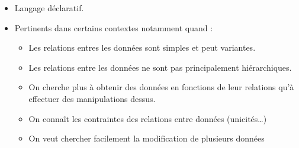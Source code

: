 \begin{slide}
	\begin{itemize}
				\item Langage déclaratif.
				\item Pertinents dans certains contextes notamment quand :
				\begin{itemize}
					\item Les relations entres les données sont simples et peut variantes.
					\item Les relations entre les données ne sont pas principalement hiérarchiques.
					\item On cherche plus à obtenir des données en fonctions de leur relations qu'à effectuer des manipulations dessus.
					\item On connaît les contraintes des relations entre données (unicités…)
					\item On veut chercher facilement la modification de plusieurs données
				\end{itemize}
	\end{itemize}
	
\end{slide}
